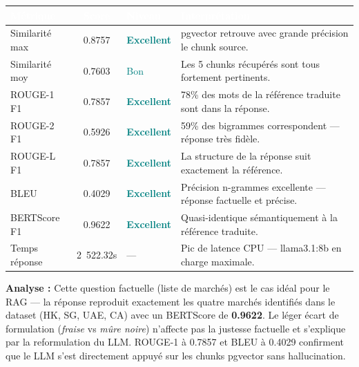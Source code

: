\documentclass[12pt,a4paper]{report}
\begin{document}
\vspace{6pt}
\begin{center}
\small
\begin{tabular}{|l|c|l|p{5.5cm}|}
  \hline
  \rowcolor{mainblue}
  \textcolor{white}{\textbf{Métrique}} &
  \textcolor{white}{\textbf{Score}} &
  \textcolor{white}{\textbf{Niveau}} &
  \textcolor{white}{\textbf{Interprétation}} \\
  \hline
  Similarité max & 0.8757 & \textcolor{teal}{\textbf{Excellent}} &
    pgvector retrouve avec grande précision le chunk source. \\
  \rowcolor{lightblue}
  Similarité moy & 0.7603 & \textcolor{teal}{Bon} &
    Les 5 chunks récupérés sont tous fortement pertinents. \\
  ROUGE-1 F1 & 0.7857 & \textcolor{teal}{\textbf{Excellent}} &
    78\% des mots de la référence traduite sont dans la réponse. \\
  \rowcolor{lightblue}
  ROUGE-2 F1 & 0.5926 & \textcolor{teal}{\textbf{Excellent}} &
    59\% des bigrammes correspondent — réponse très fidèle. \\
  ROUGE-L F1 & 0.7857 & \textcolor{teal}{\textbf{Excellent}} &
    La structure de la réponse suit exactement la référence. \\
  \rowcolor{lightblue}
  BLEU & 0.4029 & \textcolor{teal}{\textbf{Excellent}} &
    Précision n-grammes excellente — réponse factuelle et précise. \\
  BERTScore F1 & 0.9622 & \textcolor{teal}{\textbf{Excellent}} &
    Quasi-identique sémantiquement à la référence traduite. \\
  \hline
  Temps réponse & 2~522.32s & — &
    Pic de latence CPU — llama3.1:8b en charge maximale. \\
  \hline
\end{tabular}
\end{center}

\begin{infobox}
\textbf{Analyse :} Cette question factuelle (liste de marchés) est le cas idéal
pour le RAG — la réponse reproduit exactement les quatre marchés identifiés dans
le dataset (HK, SG, UAE, CA) avec un BERTScore de \textbf{0.9622}. Le léger
écart de formulation (\textit{fraise} vs \textit{mûre noire}) n'affecte pas la
justesse factuelle et s'explique par la reformulation du LLM. ROUGE-1 à 0.7857
et BLEU à 0.4029 confirment que le LLM s'est directement appuyé sur les chunks
pgvector sans hallucination.
\end{infobox}
\end{document}
